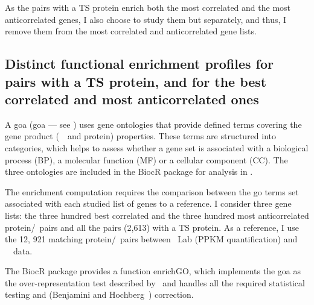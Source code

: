 As the pairs with a \gls{TS} protein enrich both the most correlated
and the most anticorrelated genes,
I also choose to study them but separately,
and thus,
I remove them from the most correlated and anticorrelated gene lists.\mybr\

\vspace{-4mm}
\subsection{Distinct functional enrichment profiles
for pairs with a TS protein,
and for the best correlated and most anticorrelated ones}
\vspace{-2mm}

A \glsdesc{goa} (\gls{goa} --- see )
uses gene ontologies that provide defined terms
covering the gene product (\ie\ \mRNA\ and protein) properties.
These terms are structured into categories,
which helps to assess whether a gene set is associated with
a biological process (BP), a molecular function (MF) or a cellular component (CC).
The three ontologies are included
in the \gls{BiocR} package 
for analysis in .\mybr\

The enrichment computation requires
the comparison between the \gls{go} terms set associated
with each studied list of genes to a reference.
I consider three gene lists:
the three hundred best correlated and
the three hundred most anticorrelated protein/\mRNA\ pairs
and all the pairs (2,613) with a \gls{TS} protein.
As a reference, I use the 12, 921 matching protein/\mRNA\ pairs
between \pandey\ Lab (\gls{PPKM} quantification) and \uhlen\ \etal\ data.\mybr\

The \gls{BiocR} package 
provides a function \textsf{enrichGO},
which implements the \gls{goa} as the over-representation test
described by~\citet{Boyle2004-dh}
and handles all the required statistical testing
and (Benjamini and Hochberg~) correction.\mybr\

